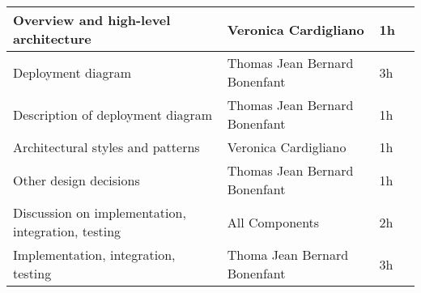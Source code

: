 \begin{table}[H]
\begin{tabular}{|l|l|l|l|}
\\ \hline
Overview and high-level architecture & Veronica Cardigliano & 1h      
\\ \hline
Deployment diagram & Thomas Jean Bernard Bonenfant & 3h                                                                                                                                                                                                                                                                            \\ \hline
Description of deployment diagram & Thomas Jean Bernard Bonenfant & 1h                                                                                                                                                                                                                                                                               \\ \hline
Architectural styles and patterns    & Veronica Cardigliano          & 1h                                                                                                                                                                                                                                                                                     \\ \hline
Other design decisions    & Thomas Jean Bernard Bonenfant & 1h   
\\ \hline   
Discussion on implementation, integration, testing & All Components  & 2h
\\ \hline                                                                                                                                                                                                                                                                                                                                                                                                                                                                                                                                                                                                                                                                                                                                                                                                                            
Implementation, integration, testing & Thoma Jean Bernard Bonenfant  & 3h     
\\ \hline                                                                                                                                                                                                                                                                                                                                                                                                                                                                                                                                                                                                                                                                                                                                                                                                                            

\end{tabular}
\end{table}
